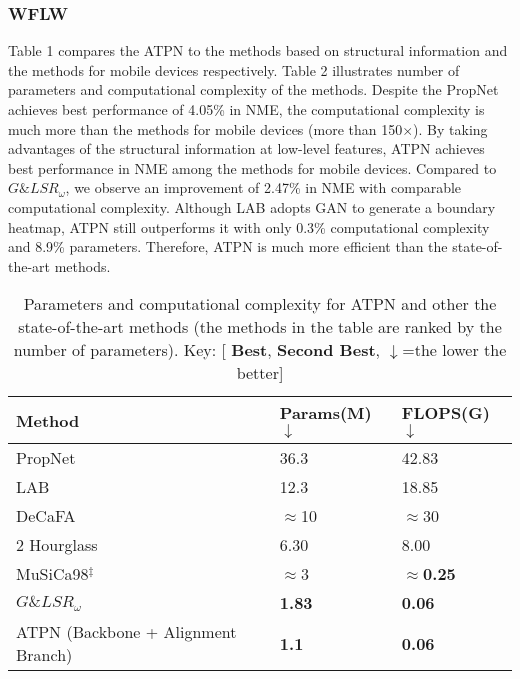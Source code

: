 \documentclass[3p,twocolumn, round, sort & compress]{elsarticle}
\begin{document}
\subsubsection{WFLW}
Table 1 compares the ATPN to the methods based on structural information and the methods for mobile devices respectively. Table 2 illustrates number of parameters and computational complexity of the methods. Despite the PropNet achieves best performance of 4.05\% in NME, the computational complexity is much more than the methods for mobile devices (more than 150$\times$). By taking advantages of the structural information at low-level features, ATPN achieves best performance in NME among the methods for mobile devices. Compared to $G\&LSR_\omega$, we observe an improvement of 2.47\% in NME with comparable computational complexity. Although LAB adopts GAN to generate a boundary heatmap, ATPN still outperforms it with only 0.3\% computational complexity and 8.9\% parameters. Therefore, ATPN is much more efficient than the state-of-the-art methods.




\begin{table}[t!]
	\centering
	\begin{tabular}{m{3cm}<{\centering}m{1.6cm}<{\centering}m{1.6cm}<{\centering}}
		\hline
		Method  & Params(M)$\downarrow$ & FLOPS(G)$\downarrow$ \\ \hline
		PropNet \citep{PropNet} & 36.3  & 42.83 \\ 
		LAB\citep{LAB} & 12.3 & 18.85 \\
		DeCaFA \citep{DeCaFA} & $\approx$10 & $\approx$30  \\
		2 Hourglass \citep{Hourglass} & 6.30 & 8.00 \\
		MuSiCa98$^\ddag$ \citep{KWTQ} & $\approx$3 & {\color{blue} \textbf{$\approx$0.25}}\\
		$G\&LSR_\omega$ \citep{RFA} & {\color{blue} \textbf{1.83}} & {\color{red} \textbf{0.06}} \\
		ATPN (Backbone + Alignment Branch) & {\color{red} \textbf{1.1}} & {\color{red} \textbf{0.06}} \\ \hline
	\end{tabular}
	\caption{Parameters and computational complexity for ATPN and other the state-of-the-art methods (the methods in the table are ranked by the number of parameters). Key: [{\color{red} \textbf{Best}}, {\color{blue} \textbf{Second Best}}, $\downarrow$=the lower the better]}
	\label{Tabal2}
\end{table}
\end{document}
